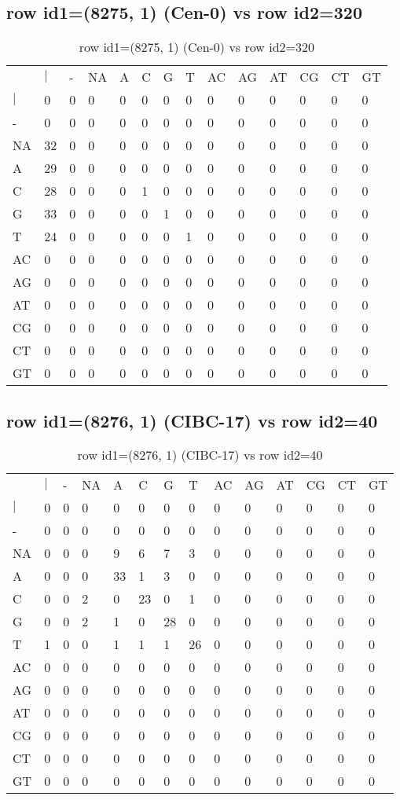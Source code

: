 \subsection{row id1=(8275, 1) (Cen-0) vs row id2=320}
\begin{center}
\begin{longtable}{|l|l|l|l|l|l|l|l|l|l|l|l|l|l|}
\caption{row id1=(8275, 1) (Cen-0) vs row id2=320} \label{table_dm238}\\
\hline
\\
\hline
&$|$&-&NA&A&C&G&T&AC&AG&AT&CG&CT&GT\\
$|$&0&0&0&0&0&0&0&0&0&0&0&0&0\\
-&0&0&0&0&0&0&0&0&0&0&0&0&0\\
NA&32&0&0&0&0&0&0&0&0&0&0&0&0\\
A&29&0&0&0&0&0&0&0&0&0&0&0&0\\
C&28&0&0&0&1&0&0&0&0&0&0&0&0\\
G&33&0&0&0&0&1&0&0&0&0&0&0&0\\
T&24&0&0&0&0&0&1&0&0&0&0&0&0\\
AC&0&0&0&0&0&0&0&0&0&0&0&0&0\\
AG&0&0&0&0&0&0&0&0&0&0&0&0&0\\
AT&0&0&0&0&0&0&0&0&0&0&0&0&0\\
CG&0&0&0&0&0&0&0&0&0&0&0&0&0\\
CT&0&0&0&0&0&0&0&0&0&0&0&0&0\\
GT&0&0&0&0&0&0&0&0&0&0&0&0&0\\
\hline
\end{longtable}
\end{center}

\subsection{row id1=(8276, 1) (CIBC-17) vs row id2=40}
\begin{center}
\begin{longtable}{|l|l|l|l|l|l|l|l|l|l|l|l|l|l|}
\caption{row id1=(8276, 1) (CIBC-17) vs row id2=40} \label{table_dm240}\\
\hline
\\
\hline
&$|$&-&NA&A&C&G&T&AC&AG&AT&CG&CT&GT\\
$|$&0&0&0&0&0&0&0&0&0&0&0&0&0\\
-&0&0&0&0&0&0&0&0&0&0&0&0&0\\
NA&0&0&0&9&6&7&3&0&0&0&0&0&0\\
A&0&0&0&33&1&3&0&0&0&0&0&0&0\\
C&0&0&2&0&23&0&1&0&0&0&0&0&0\\
G&0&0&2&1&0&28&0&0&0&0&0&0&0\\
T&1&0&0&1&1&1&26&0&0&0&0&0&0\\
AC&0&0&0&0&0&0&0&0&0&0&0&0&0\\
AG&0&0&0&0&0&0&0&0&0&0&0&0&0\\
AT&0&0&0&0&0&0&0&0&0&0&0&0&0\\
CG&0&0&0&0&0&0&0&0&0&0&0&0&0\\
CT&0&0&0&0&0&0&0&0&0&0&0&0&0\\
GT&0&0&0&0&0&0&0&0&0&0&0&0&0\\
\hline
\end{longtable}
\end{center}


